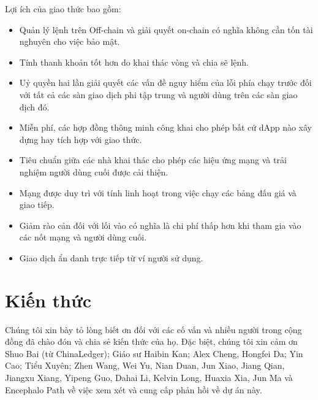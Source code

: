 \documentclass[12pt,a4paper]{article}
\begin{document}
\begin{multicols}{2}
Lợi ích của giao thức bao gồm:

\begin{itemize}
	\item Quản lý lệnh trên Off-chain  và giải quyết on-chain  có nghĩa không cần tốn tài nghuyên cho việc bảo mật.
	\item Tính thanh khoản tốt hơn do khai thác vòng và chia sẽ lệnh.
	\item Uỷ quyền hai lần giải quyết các vấn đề nguy hiểm của lỗi phía chạy trước đối với tất cả các sàn giao dịch phi tập trung và người dùng trên các sàn giao dịch đó.
	\item Miễn phí, các hợp đồng thông minh công khai cho phép bất cứ dApp nào xây dựng hay tích hợp với giao thức.
	\item Tiêu chuẩn giữa các nhà khai thác cho phép các hiệu ứng mạng và trải nghiệm người dùng cuối được cải thiện.
	\item Mạng được duy trì với tính linh hoạt trong việc chạy các bảng đấu giá và giao tiếp.
	\item Giảm rào cản đối với lối vào có nghĩa là chi phí thấp hơn khi tham gia vào các nốt mạng và người dùng cuối.
	\item Giao dịch ẩn danh trực tiếp từ ví người sử dụng.
\end{itemize}
\section{Kiến thức}
Chúng tôi xin bày tỏ lòng biết ơn đối với các cố vấn và nhiều người trong cộng đồng đã chào đón và chia sẻ kiến thức của họ. Đặc biệt, chúng tôi xin cảm ơn Shuo Bai (từ ChinaLedger); Giáo sư Haibin Kan; Alex Cheng, Hongfei Da; Yin Cao; Tiểu Xuyên; Zhen Wang, Wei Yu, Nian Duan, Jun Xiao, Jiang Qian, Jiangxu Xiang, Yipeng Guo, Dahai Li, Kelvin Long, Huaxia Xia, Jun Ma và Encephalo Path về việc xem xét và cung cấp phản hồi về dự án này.



\end{multicols}
\end{document}
